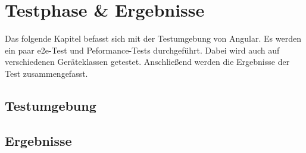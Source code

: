 %
%
%
\chapter{Testphase \& Ergebnisse}
\label{cha:testphase}
%
Das folgende Kapitel befasst sich mit der Testumgebung von Angular. Es werden ein paar e2e-Test und Peformance-Tests durchgeführt. Dabei wird auch auf verschiedenen Geräteklassen getestet. Anschließend werden die Ergebnisse der Test zusammengefasst.
\section{Testumgebung}
\section{Ergebnisse}